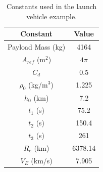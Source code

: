 \documentclass[10pt,final]{report}
\newcounter{example}[chapter]
\begin{document}

\begin{table}[htdp]
\caption{Constants used in the launch vehicle example.}
\begin{center}
\begin{tabular}{|c|c|}
\hline
Constant & Value \\
\hline \hline
Payload Mass (kg) & 4164 \\
\hline
$A_{ref}$ (m${}^2$) & $4\pi$ \\
\hline
$C_d$ & 0.5 \\
\hline
$\rho_0$ (kg/m${}^3$)& 1.225 \\
\hline
$h_0$ (km) & 7.2\\
\hline
$t_1$ (s) & 75.2 \\
\hline
 $t_2$ (s) & 150.4 \\
\hline
 $t_3$ (s) & 261 \\
\hline
 $R_e$ (km) & 6378.14 \\
\hline
 $V_E$ (km/s) & 7.905\\
\hline
\end{tabular}
\end{center}
\label{dynamics properties}
\end{table}
\end{document}
